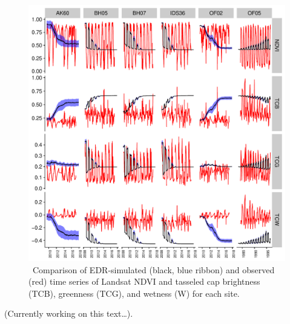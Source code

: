 \begin{figure}
  \centering
  \includegraphics[width=\textwidth]{figures/landsat_ts.pdf}
  \caption{\
    Comparison of EDR-simulated (black, blue ribbon) and observed (red) time series of Landsat NDVI and tasseled cap brightness (TCB), greenness (TCG), and wetness (W) for each site.
  }
\end{figure}

(Currently working on this text\ldots).
